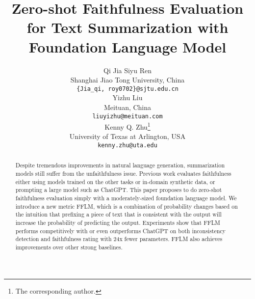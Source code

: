 \documentclass[11pt]{article}
\title{Zero-shot Faithfulness Evaluation for Text Summarization with Foundation Language Model}
\author{Qi Jia \hspace*{1cm}  Siyu Ren\\
	Shanghai Jiao Tong University, China\\
	\texttt{\{Jia\_qi, roy0702\}@sjtu.edu.cn} \\
	\And
	Yizhu Liu\\
	Meituan, China\\
	\texttt{liuyizhu@meituan.com}\\
	\AND
	Kenny Q. Zhu\textsuperscript{\rm}\thanks{\hspace{2mm}The corresponding author.}\\
	University of Texas at Arlington, USA\\
	\texttt{kenny.zhu@uta.edu} \\
}
\begin{document}
\maketitle
\begin{abstract}

Despite tremendous improvements in natural language generation, 
summarization models still suffer from the unfaithfulness issue.
Previous work evaluates faithfulness either using models trained on the other tasks or in-domain synthetic data, or prompting a large model such as ChatGPT.
This paper proposes to do zero-shot faithfulness evaluation simply with 
a moderately-sized foundation language model. 
We introduce a new metric FFLM, which is a combination of probability changes based on the intuition that prefixing a piece of text that is 
consistent with the output will increase the probability of predicting the output.
Experiments show that FFLM performs competitively with or even 
outperforms ChatGPT on both inconsistency detection and  faithfulness rating with 24x fewer parameters. 
FFLM also achieves improvements over other strong baselines.
\end{abstract}





%






\appendix

\end{document}
